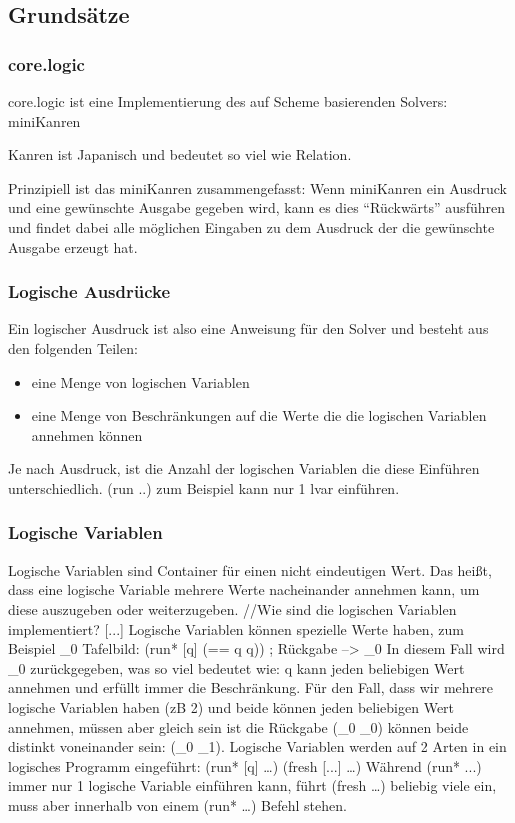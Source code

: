 \subsection{Grundsätze}

\subsubsection{core.logic}

core.logic ist eine Implementierung des auf Scheme basierenden Solvers: miniKanren

Kanren ist Japanisch und bedeutet so viel wie Relation.

Prinzipiell ist das miniKanren zusammengefasst: Wenn miniKanren ein Ausdruck und eine gewünschte Ausgabe gegeben wird, kann es dies “Rückwärts” ausführen und findet dabei alle möglichen Eingaben zu dem Ausdruck der die gewünschte Ausgabe erzeugt hat.

\subsubsection{Logische Ausdrücke}

Ein logischer Ausdruck ist also eine Anweisung für den Solver und besteht aus den folgenden Teilen:
\begin{itemize}

\item eine Menge von logischen Variablen

\item eine Menge von Beschränkungen auf die Werte die die logischen Variablen annehmen können

\end{itemize}

Je nach Ausdruck, ist die Anzahl der logischen Variablen die diese Einführen unterschiedlich. (run ..) zum Beispiel kann nur 1 lvar einführen.


\subsubsection{Logische Variablen}
Logische Variablen sind Container für einen nicht eindeutigen Wert. Das heißt, dass eine logische Variable mehrere Werte nacheinander annehmen kann, um diese auszugeben oder weiterzugeben.
//Wie sind die logischen Variablen implementiert? [...]
Logische Variablen können spezielle Werte haben, zum Beispiel _0 
Tafelbild: (run* [q] (== q q)) ; Rückgabe --> _0
In diesem Fall wird _0 zurückgegeben, was so viel bedeutet wie: q kann jeden beliebigen Wert annehmen und erfüllt immer die Beschränkung.
Für den Fall, dass wir mehrere logische Variablen haben (zB 2) und beide können jeden beliebigen Wert annehmen, müssen aber gleich sein ist die Rückgabe (_0 _0) können beide distinkt voneinander sein: (_0 _1).
Logische Variablen werden auf 2 Arten in ein logisches Programm eingeführt:
(run* [q] …)
(fresh [...] …)
Während (run* ...) immer nur 1 logische Variable einführen kann, führt (fresh …) beliebig viele ein, muss aber innerhalb von einem (run* …) Befehl stehen.

